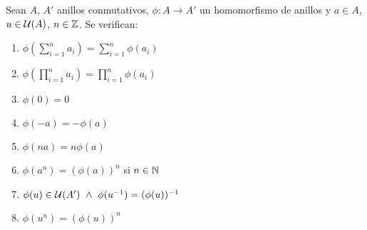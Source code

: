 \begin{prop}
    Sean $A$, $A'$ anillos conmutativos, $\phi:A \longrightarrow A'$ un homomorfismo de anillos y $a \in A$, $u \in \mathcal{U}(A)$, $n \in \mathbb Z$.
    Se verifican:
    \begin{enumerate}
        \item $\phi\left( \sum\limits_{i=1}^n a_i \right) = \sum\limits_{i=1}^{n} \phi(a_i)$
        \item $\phi\left( \prod\limits_{i=1}^n a_i \right) = \prod\limits_{i=1}^n \phi(a_i)$
        \item $\phi(0)=0$
        \item $\phi(-a) = -\phi(a)$
        \item $\phi(na) = n\phi(a)$
        \item $\phi(a^n) = (\phi(a))^n$ si $n \in \mathbb N$
        \item $\phi(u) \in \mathcal{U}(A') \ \land \  \phi(u^{-1}) = (\phi(u))^{-1}$
        \item $\phi(u^n) = (\phi(u))^n$
    \end{enumerate}
\end{prop}
